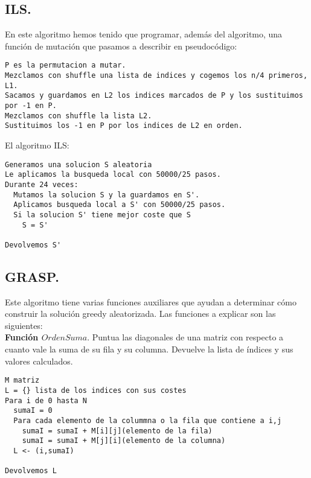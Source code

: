 \subsection{ILS.}

En este algoritmo hemos tenido que programar, además del algoritmo, una función de mutación que pasamos a describir en pseudocódigo:\\

\noindent\hrulefill
\begin{lstlisting}
P es la permutacion a mutar.
Mezclamos con shuffle una lista de indices y cogemos los n/4 primeros, L1.
Sacamos y guardamos en L2 los indices marcados de P y los sustituimos por -1 en P.
Mezclamos con shuffle la lista L2.
Sustituimos los -1 en P por los indices de L2 en orden.
\end{lstlisting}
\noindent\hrulefill

El algoritmo ILS:\\

\noindent\hrulefill
\begin{lstlisting}
Generamos una solucion S aleatoria
Le aplicamos la busqueda local con 50000/25 pasos.
Durante 24 veces:
  Mutamos la solucion S y la guardamos en S'.
  Aplicamos busqueda local a S' con 50000/25 pasos.
  Si la solucion S' tiene mejor coste que S
    S = S'

Devolvemos S'
\end{lstlisting}

\subsection{GRASP.}

Este algoritmo tiene varias funciones auxiliares que ayudan a determinar cómo construir la solución greedy aleatorizada. Las funciones a explicar son las siguientes:\\

\textbf{Función $OrdenSuma$}. Puntua las diagonales de una matriz con respecto a cuanto vale la suma de su fila y su columna. Devuelve la lista de índices y sus valores calculados.

\noindent\hrulefill

\begin{lstlisting}
M matriz
L = {} lista de los indices con sus costes
Para i de 0 hasta N
  sumaI = 0
  Para cada elemento de la colummna o la fila que contiene a i,j
    sumaI = sumaI + M[i][j](elemento de la fila)
    sumaI = sumaI + M[j][i](elemento de la columna)
  L <- (i,sumaI)

Devolvemos L
\end{lstlisting}

